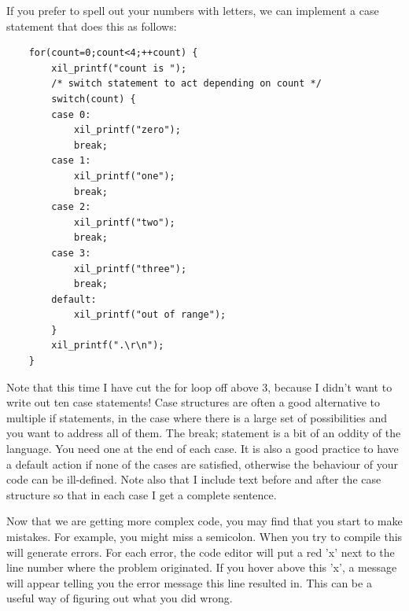 \documentclass[../physical_computing.tex]{subfiles}
\begin{document}
If you prefer to spell out your numbers with letters, we can
implement a case statement that does this as follows:

\begin{verbatim}
    for(count=0;count<4;++count) {
    	xil_printf("count is ");
    	/* switch statement to act depending on count */
    	switch(count) {
    	case 0:
    		xil_printf("zero");
    		break;
    	case 1:
    		xil_printf("one");
    		break;
    	case 2:
    		xil_printf("two");
    		break;
    	case 3:
    		xil_printf("three");
    		break;
    	default:
    		xil_printf("out of range");
    	}
    	xil_printf(".\r\n");
    }
\end{verbatim}

Note that this time I have cut the for loop off above 3, because
I didn't want to write out ten case statements! Case structures
are often a good alternative to multiple if statements, in the case
where there is a large set of possibilities and you want to address
all of them. The break; statement is a bit of an oddity of the 
language. You need one at the end of each case. It is also a good
practice to have a default action if none of the cases are satisfied,
otherwise the behaviour of your code can be ill-defined. Note
also that I include text before and after the case structure so that
in each case I get a complete sentence.

Now that we are getting more complex code, you may find that you 
start to make mistakes. For example, you might miss a semicolon.
When you try to compile this will generate errors. For each error, 
the code editor will put a red 'x' next to the line number where
the problem originated. If you hover above this 'x', a message will 
appear telling you the error message this line resulted in. This 
can be a useful way of figuring out what you did wrong.
\end{document}
